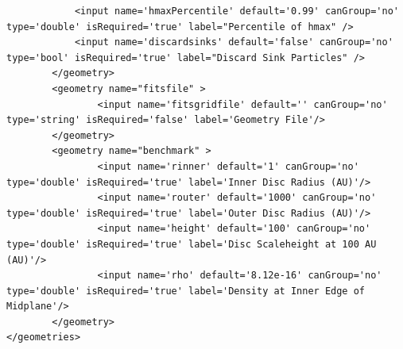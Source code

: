 \documentclass[a4paper,10pt]{article}
\begin{document}
\begin{lstlisting}
            <input name='hmaxPercentile' default='0.99' canGroup='no' type='double' isRequired='true' label="Percentile of hmax" />
            <input name='discardsinks' default='false' canGroup='no' type='bool' isRequired='true' label="Discard Sink Particles" />
        </geometry>
        <geometry name="fitsfile" >
                <input name='fitsgridfile' default='' canGroup='no' type='string' isRequired='false' label='Geometry File'/>
        </geometry>
        <geometry name="benchmark" >
                <input name='rinner' default='1' canGroup='no' type='double' isRequired='true' label='Inner Disc Radius (AU)'/>
                <input name='router' default='1000' canGroup='no' type='double' isRequired='true' label='Outer Disc Radius (AU)'/>
                <input name='height' default='100' canGroup='no' type='double' isRequired='true' label='Disc Scaleheight at 100 AU (AU)'/>
                <input name='rho' default='8.12e-16' canGroup='no' type='double' isRequired='true' label='Density at Inner Edge of Midplane'/>
        </geometry>
</geometries>

\end{lstlisting}
\end{document}
